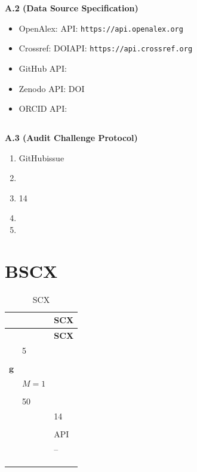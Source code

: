 \documentclass[12pt,a4paper]{article}
\theoremstyle{remark}
\newcommand{\gaugeVec}{\mathbf{g}}
\begin{document}
\noindent
\textbf{A.2  (Data Source Specification)}

\begin{itemize}
    \item OpenAlex: API: \texttt{https://api.openalex.org}
    \item Crossref: DOIAPI: \texttt{https://api.crossref.org}
    \item GitHub API: 
    \item Zenodo API: DOI
    \item ORCID API: 
\end{itemize}



\subsection{}

\noindent
\textbf{A.3  (Audit Challenge Protocol)}

\begin{enumerate}[label=(\arabic*)]
    \item GitHubissue
    \item 
    \item 14
    \item 
    \item 
\end{enumerate}

\newpage

\section{BSCX}
\label{sec:appendix_comparison}

\begin{longtable}{p{} p{} p{}}
\caption{SCX} \\
\hline
\textbf{} & \textbf{} & \textbf{SCX} \\
\hline
\endfirsthead
\hline
\textbf{} & \textbf{} & \textbf{SCX} \\
\hline
\endhead

 & 5 &  \\
\hline
 &  &  \\
\hline
 $\gaugeVec$ &  &  \\
\hline
 & $M=1$  &  \\
\hline
 &  &  \\
\hline
 & 50 &  \\
\hline
 &  & 14 \\
\hline
 &  &  \\
\hline
 &  & API \\
\hline
 &  & -- \\
\hline
 &  &  \\
\hline
 &  &  \\
\hline
 &  &  \\
\hline
\end{longtable}
\end{document}
